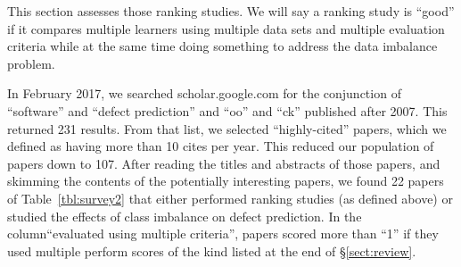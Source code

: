 \documentclass[10pt,conference]{IEEEtran}
\theoremstyle{break}
\theoremstyle{break}
\newcommand{\tion}[1]{{\S}\ref{sect:#1}}
\begin{document}
This section assesses those ranking studies. We will say a ranking study is ``good'' if it compares multiple learners using multiple data sets and multiple evaluation criteria
while at the same time doing something to address the data imbalance problem.

 In February  2017,  we searched
scholar.google.com for the conjunction of ``software'' and ``defect prediction'' and ``oo'' and ``ck'' published after 2007. This returned 231 results.
From that list, we selected ``highly-cited'' papers, which we defined as having more than 10 cites per year.  This reduced our population of papers down to 107.
After reading the titles and abstracts of those papers, and skimming the contents of the potentially interesting papers, we found 22 papers of Table~\ref{tbl:survey2} that either performed ranking studies
(as defined above) or studied the effects of class imbalance on defect prediction. In the column``evaluated using
multiple criteria'',
papers scored more than ``1'' if they used multiple perform scores  of the kind listed at the end of \tion{review}. 
\end{document}
